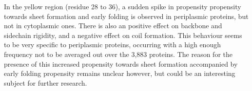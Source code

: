 In the yellow region (residue 28 to 36),
a sudden spike in propensity propensity towards sheet formation and early folding is observed in periplasmic proteins,
but not in cytoplasmic ones.
There is also an positive effect on backbone and sidechain rigidity,
and a negative effect on coil formation.
This behaviour seems to be very specific to periplasmic proteins,
occurring with a high enough frequency not to be averaged out over the 3,883 proteins.
The reason for the presence of this increased propensity towards sheet formation accompanied by early folding propensity remains unclear however, 
but could be an interesting subject for further research.


